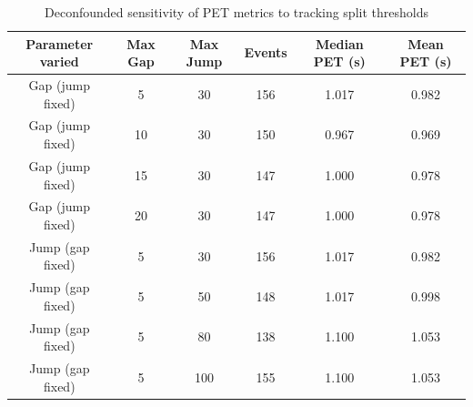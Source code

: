 \begin{table}[h]
\centering
\caption{Deconfounded sensitivity of PET metrics to tracking split thresholds}
\label{tab:sensitivity_deconfounded}
\begin{tabular}{cccccc}
\hline
\textbf{Parameter varied} & \textbf{Max Gap} & \textbf{Max Jump} & \textbf{Events} & \textbf{Median PET (s)} & \textbf{Mean PET (s)} \\
\hline
Gap (jump fixed) & 5 & 30 & 156 & 1.017 & 0.982 \\
Gap (jump fixed) & 10 & 30 & 150 & 0.967 & 0.969 \\
Gap (jump fixed) & 15 & 30 & 147 & 1.000 & 0.978 \\
Gap (jump fixed) & 20 & 30 & 147 & 1.000 & 0.978 \\
Jump (gap fixed) & 5 & 30 & 156 & 1.017 & 0.982 \\
Jump (gap fixed) & 5 & 50 & 148 & 1.017 & 0.998 \\
Jump (gap fixed) & 5 & 80 & 138 & 1.100 & 1.053 \\
Jump (gap fixed) & 5 & 100 & 155 & 1.100 & 1.053 \\
\hline
\end{tabular}
\end{table}